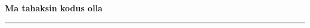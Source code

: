 \documentclass[10pt]{book}
\begin{document}
{
  \samepage
  \raggedbottom
  \raggedright
  \sloppy


  \vspace{0.2in}

  \noindent\begin{minipage}{.1\textwidth}
    \hfill\vspace{0.1in}
  \end{minipage}%
  \noindent\begin{minipage}{.8\textwidth}
    \centering
    \bfseries
    \large Ma tahaksin kodus olla
  \end{minipage}%
  \noindent\begin{minipage}{.1\textwidth}
      \hfill\vspace{0.1in}
  \end{minipage}

  \nopagebreak[4]
  \vspace{0.1in}
  \nopagebreak[4]
  \hrule height 0.05ex
  \nopagebreak[4]
  \vspace{-0.05in}




}
\end{document}

